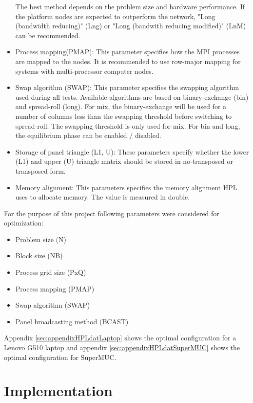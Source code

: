 \documentclass[10pt,twocolumn]{article}
\begin{document}
\begin{itemize}
The best method depends on the problem size and hardware performance. If the platform nodes are expected to outperform the network, "Long (bandwidth reducing)" (Lng) or "Long (bandwith reducing modified)" (LnM) can be recommended.

\item Process mapping(PMAP): This parameter specifies how the MPI processes are mapped to the nodes. It is recommended to use row-major mapping for systems with multi-processor computer nodes.

\item Swap algorithm (SWAP): This parameter specifies the swapping algorithm used during all tests. Available algorithms are based on binary-exchange (bin) and spread-roll (long). For mix, the binary-exchange will be used for a number of columns less than the swapping threshold before switching to spread-roll. The swapping threshold is only used for mix. For bin and long, the equilibrium phase can be enabled / disabled.

\item Storage of panel triangle (L1, U): These parameters specify whether the lower (L1) and upper (U) triangle matrix should be stored in no-transposed or transposed form.

\item Memory alignment: This parameters specifies the memory alignment HPL uses to allocate memory. The value is measured in double.
\end{itemize}

For the purpose of this project following parameters were considered for optimization:
\begin{itemize}
\item Problem size (N)
\item Block size (NB)
\item Process grid size (PxQ)
\item Process mapping (PMAP)
\item Swap algorithm (SWAP)
\item Panel broadcasting method (BCAST)
\end{itemize}

Appendix \ref{sec:appendixHPLdatLaptop} shows the optimal configuration for a Lenovo G510 laptop and appendix \ref{sec:appendixHPLdatSuperMUC} shows the optimal configuration for SuperMUC.



\section{Implementation}
\label{sec:implementation}
\end{document}
